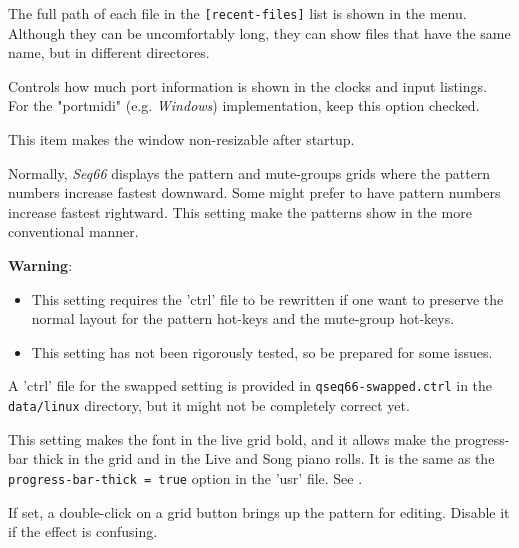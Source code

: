    The full path of each file in the \texttt{[recent-files]} list
   is shown in the menu.  Although they can be uncomfortably long, they can
   show files that have the same name, but in different directores.

   Controls how much port information is shown in the clocks and input
   listings.  For the "portmidi" (e.g. \textsl{Windows})
   implementation, keep this option checked.

   This item makes the window non-resizable after startup.

   Normally, \textsl{Seq66} displays the pattern and mute-groups grids
   where the pattern numbers increase fastest downward.
   Some might prefer to have pattern numbers increase fastest rightward.
   This setting make the patterns show in the more conventional manner.

   \textbf{Warning}:

      \begin{itemize}
         \item This setting requires the 'ctrl' file to be rewritten
            if one want to preserve the normal layout for the pattern hot-keys
            and the mute-group hot-keys.
         \item This setting has not been rigorously tested, so be prepared for
            some issues.
      \end{itemize}

   A 'ctrl' file for the swapped setting is provided
   in \texttt{qseq66-swapped.ctrl} in the \texttt{data/linux}
   directory, but it might not be completely correct yet.

   This setting makes the font in the live grid bold, and it allows
   make the progress-bar thick in the grid and in the Live and Song piano
   rolls.
   It is the same as the \texttt{progress-bar-thick = true} option in the 'usr'
   file. See .

   If set, a double-click on a grid button brings up the pattern for editing.
   Disable it if the effect is confusing.

